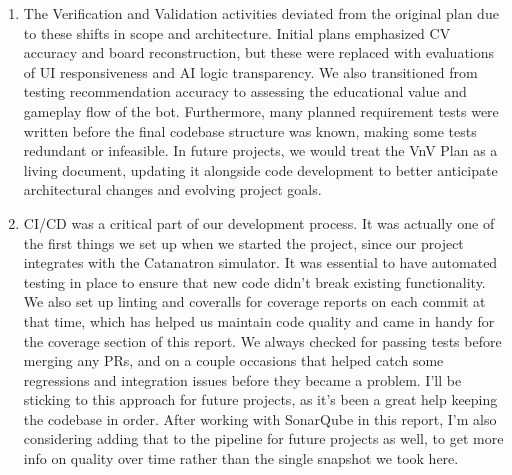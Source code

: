 \documentclass[12pt, titlepage]{article}
\begin{document}
\begin{enumerate}
        \item
        The Verification and Validation activities deviated from the original plan due to these
        shifts in scope and architecture. Initial plans emphasized CV accuracy and board 
        reconstruction, but these were replaced with evaluations of UI responsiveness and AI logic 
        transparency. We also transitioned from testing recommendation accuracy to assessing the 
        educational value and gameplay flow of the bot. Furthermore, many planned requirement 
        tests were written before the final codebase structure was known, making some tests 
        redundant or infeasible. In future projects, we would treat the VnV Plan as a living document, 
        updating it alongside code development to better anticipate architectural changes and evolving project goals.
      \item CI/CD was a critical part of our development process.
        It was actually one of the first things we set up when we started the project, since our project integrates with the Catanatron simulator.
        It was essential to have automated testing in place to ensure that new code didn’t break existing functionality.
        We also set up linting and coveralls for coverage reports on each commit at that time, which has helped us maintain code quality and came in handy for the coverage section of this report.
        We always checked for passing tests before merging any PRs, and on a couple occasions that helped catch some regressions and integration issues before they became a problem.
        I'll be sticking to this approach for future projects, as it's been a great help keeping the codebase in order.
        After working with SonarQube in this report, I'm also considering adding that to the pipeline for future projects as well, to get more info on quality over time rather than the single snapshot we took here.
      \end{enumerate}
    
\end{document}
